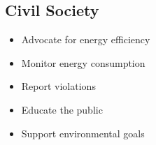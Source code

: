 \subsection{Civil Society}

\begin{itemize}
    \item Advocate for energy efficiency
    \item Monitor energy consumption
    \item Report violations
    \item Educate the public
    \item Support environmental goals
\end{itemize}

\cleardoublepage
